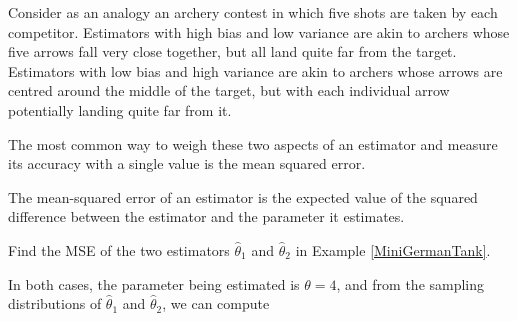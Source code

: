 \par
Consider as an analogy an archery contest in which five shots are taken by each competitor. Estimators with high bias and low variance are akin to archers whose five arrows fall very close together, but all land quite far from the target. Estimators with low bias and high variance are akin to archers whose arrows are centred around the middle of the target, but with each individual arrow potentially landing quite far from it.
\par
The most common way to weigh these two aspects of an estimator and measure its accuracy with a single value is the mean squared error.
\par
\begin{defn} The mean-squared error of an estimator is the expected value of the squared difference between the estimator and the parameter it estimates.
\end{defn}
\begin{examp}Find the MSE of the two estimators $\widehat{\theta}_1$ and $\widehat{\theta}_2$ in Example \ref{MiniGermanTank}.
\par
\noindent In both cases, the parameter being estimated is $\theta = 4$, and from the sampling distributions of $\widehat{\theta}_1$ and $\widehat{\theta}_2$, we can compute 
\end{examp}
\par

